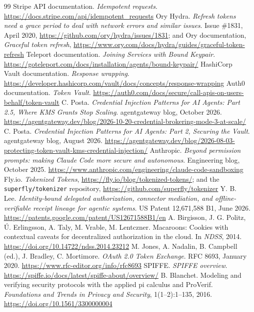 \documentclass[11pt]{article}
\begin{document}
\begin{thebibliography}{99}
 Stripe API documentation. \emph{Idempotent requests}. \url{https://docs.stripe.com/api/idempotent_requests}
 Ory Hydra. \emph{Refresh tokens need a grace period to deal with network errors and similar issues}. Issue \#1831, April 2020, \url{https://github.com/ory/hydra/issues/1831}; and Ory documentation, \emph{Graceful token refresh}, \url{https://www.ory.com/docs/hydra/guides/graceful-token-refresh}
 Teleport documentation. \emph{Joining Services with Bound Keypair}. \url{https://goteleport.com/docs/installation/agents/bound-keypair/}
 HashiCorp Vault documentation. \emph{Response wrapping}. \url{https://developer.hashicorp.com/vault/docs/concepts/response-wrapping}
 Auth0 documentation. \emph{Token Vault}. \url{https://auth0.com/docs/secure/call-apis-on-users-behalf/token-vault}
 C. Posta. \emph{Credential Injection Patterns for AI Agents: Part 2.5, Where KMS Grants Stop Scaling}. agentgateway blog, October 2026. \url{https://agentgateway.dev/blog/2026-10-20-credential-brokering-mode-3-at-scale/}
 C. Posta. \emph{Credential Injection Patterns for AI Agents: Part 2, Securing the Vault}. agentgateway blog, August 2026. \url{https://agentgateway.dev/blog/2026-08-03-protecting-token-vault-kms-credential-injection/}
 Anthropic. \emph{Beyond permission prompts: making Claude Code more secure and autonomous}. Engineering blog, October 2025. \url{https://www.anthropic.com/engineering/claude-code-sandboxing}
 Fly.io. \emph{Tokenized Tokens}, \url{https://fly.io/blog/tokenized-tokens/}; and the \texttt{superfly/tokenizer} repository, \url{https://github.com/superfly/tokenizer}
 Y. B. Lee. \emph{Identity-bound delegated authorization, connector mediation, and offline-verifiable receipt lineage for agentic systems}. US Patent 12,671,588 B1, June 2026. \url{https://patents.google.com/patent/US12671588B1/en}
 A. Birgisson, J. G. Politz, {\'U}. Erlingsson, A. Taly, M. Vrable, M. Lentczner. Macaroons: Cookies with contextual caveats for decentralized authorization in the cloud. In \emph{NDSS}, 2014. \url{https://doi.org/10.14722/ndss.2014.23212}
 M. Jones, A. Nadalin, B. Campbell (ed.), J. Bradley, C. Mortimore. \emph{OAuth 2.0 Token Exchange}. RFC 8693, January 2020. \url{https://www.rfc-editor.org/info/rfc8693}
 SPIFFE. \emph{SPIFFE overview}. \url{https://spiffe.io/docs/latest/spiffe-about/overview/}
 B. Blanchet. Modeling and verifying security protocols with the applied pi calculus and ProVerif. \emph{Foundations and Trends in Privacy and Security}, 1(1--2):1--135, 2016. \url{https://doi.org/10.1561/3300000004}

\end{thebibliography}
\end{document}
